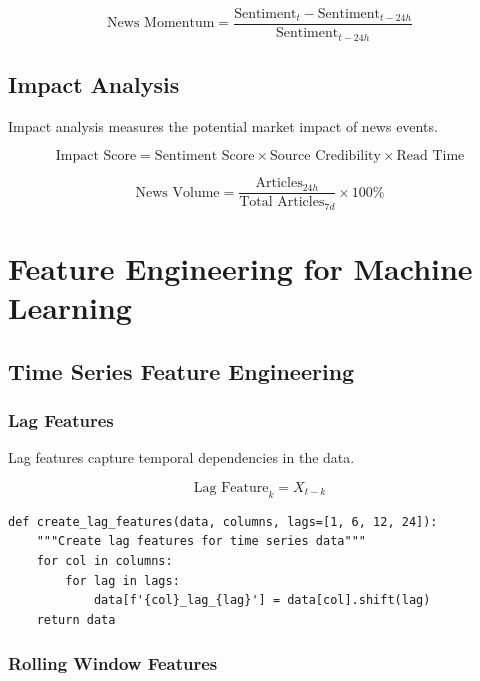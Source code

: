 \documentclass[12pt,a4paper]{article}
\begin{document}
\begin{equation}
\text{News Momentum} = \frac{\text{Sentiment}_{t} - \text{Sentiment}_{t-24h}}{\text{Sentiment}_{t-24h}}
\end{equation}

\subsection{Impact Analysis}

Impact analysis measures the potential market impact of news events.

\begin{equation}
\text{Impact Score} = \text{Sentiment Score} \times \text{Source Credibility} \times \text{Read Time}
\end{equation}

\begin{equation}
\text{News Volume} = \frac{\text{Articles}_{24h}}{\text{Total Articles}_{7d}} \times 100\%
\end{equation}

\section{Feature Engineering for Machine Learning}

\subsection{Time Series Feature Engineering}

\subsubsection{Lag Features}

Lag features capture temporal dependencies in the data.

\begin{equation}
\text{Lag Feature}_k = X_{t-k}
\end{equation}

\begin{lstlisting}
def create_lag_features(data, columns, lags=[1, 6, 12, 24]):
    """Create lag features for time series data"""
    for col in columns:
        for lag in lags:
            data[f'{col}_lag_{lag}'] = data[col].shift(lag)
    return data
\end{lstlisting}

\subsubsection{Rolling Window Features}
\end{document}

